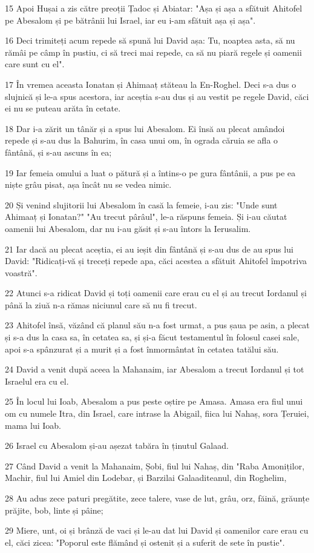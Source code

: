 \par 15 Apoi Hușai a zis către preoții Țadoc și Abiatar: "Așa și așa a sfătuit Ahitofel pe Abesalom și pe bătrânii lui Israel, iar eu i-am sfătuit așa și așa".
\par 16 Deci trimiteți acum repede să spună lui David așa: Tu, noaptea asta, să nu rămâi pe câmp în pustiu, ci să treci mai repede, ca să nu piară regele și oamenii care sunt cu el".
\par 17 În vremea aceasta Ionatan și Ahimaaț stăteau la En-Roghel. Deci s-a dus o slujnică și le-a spus acestora, iar aceștia s-au dus și au vestit pe regele David, căci ei nu se puteau arăta în cetate.
\par 18 Dar i-a zărit un tânăr și a spus lui Abesalom. Ei însă au plecat amândoi repede și s-au dus la Bahurim, în casa unui om, în ograda căruia se afla o fântână, și s-au ascuns în ea;
\par 19 Iar femeia omului a luat o pătură și a întins-o pe gura fântânii, a pus pe ea niște grâu pisat, așa încât nu se vedea nimic.
\par 20 Și venind slujitorii lui Abesalom în casă la femeie, i-au zis: "Unde sunt Ahimaaț și Ionatan?" "Au trecut pârâul", le-a răspuns femeia. Și i-au căutat oamenii lui Abesalom, dar nu i-au găsit și s-au întors la Ierusalim.
\par 21 Iar dacă au plecat aceștia, ei au ieșit din fântână și s-au dus de au spus lui David: "Ridicați-vă și treceți repede apa, căci acestea a sfătuit Ahitofel împotriva voastră".
\par 22 Atunci s-a ridicat David și toți oamenii care erau cu el și au trecut Iordanul și până la ziuă n-a rămas niciunul care să nu fi trecut.
\par 23 Ahitofel însă, văzând că planul său n-a fost urmat, a pus șaua pe asin, a plecat și s-a dus la casa sa, în cetatea sa, și și-a făcut testamentul în folosul casei sale, apoi s-a spânzurat și a murit și a fost înmormântat în cetatea tatălui său.
\par 24 David a venit după aceea la Mahanaim, iar Abesalom a trecut Iordanul și tot Israelul era cu el.
\par 25 În locul lui Ioab, Abesalom a pus peste oștire pe Amasa. Amasa era fiul unui om cu numele Itra, din Israel, care intrase la Abigail, fiica lui Nahaș, sora Țeruiei, mama lui Ioab.
\par 26 Israel cu Abesalom și-au așezat tabăra în ținutul Galaad.
\par 27 Când David a venit la Mahanaim, Șobi, fiul lui Nahaș, din "Raba Amoniților, Machir, fiul lui Amiel din Lodebar, și Barzilai Galaaditeanul, din Roghelim,
\par 28 Au adus zece paturi pregătite, zece talere, vase de lut, grâu, orz, făină, grăunțe prăjite, bob, linte și pâine;
\par 29 Miere, unt, oi și brânză de vaci și le-au dat lui David și oamenilor care erau cu el, căci zicea: "Poporul este flămând și ostenit și a suferit de sete în pustie".

